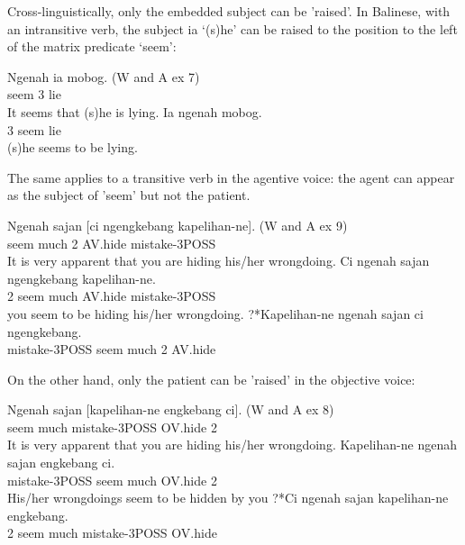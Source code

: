 \documentclass[output=paper]{langsci/langscibook}
\begin{document}
Cross-linguistically, only the embedded subject can be 'raised'. In Balinese, with an intransitive verb, the subject ia ‘(s)he’ can be raised to the position to the left of the matrix predicate  ‘seem’:

\begin{exe}
\ex \begin{xlist}
\ex \gll Ngenah ia mobog. (W and A ex 7)\\
seem 3 lie\\
\glt It seems that (s)he is lying.
\ex \gll  Ia ngenah mobog.\\
3 seem lie\\
\glt (s)he seems to be lying.
\end{xlist}
\end{exe}

The same applies to a transitive verb in the agentive voice: the agent can appear as the subject of 'seem' but not the patient.

\begin{exe}
\ex \begin{xlist}
\ex \gll Ngenah sajan [ci ngengkebang kapelihan-ne]. (W and A ex 9)\\
seem much 2 AV.hide mistake-3POSS\\
\glt It is very apparent that you are hiding his/her wrongdoing.
\ex \gll Ci ngenah sajan ngengkebang kapelihan-ne.\\
2 seem much AV.hide mistake-3POSS\\
\glt you seem to be hiding his/her wrongdoing.
\ex ?*Kapelihan-ne ngenah sajan ci ngengkebang.\\
mistake-3POSS seem much 2 AV.hide
\end{xlist}

\end{exe}

On the other hand, only the patient can be 'raised' in the objective voice:

\begin{exe}
\ex \begin{xlist}
\ex \gll Ngenah sajan [kapelihan-ne engkebang ci]. (W and A ex 8)\\
seem much mistake-3POSS OV.hide 2\\
\glt It is very apparent that you are hiding his/her wrongdoing.
\ex \gll Kapelihan-ne ngenah sajan engkebang ci.\\
mistake-3POSS seem much OV.hide 2 \\
\glt His/her wrongdoings seem to be hidden by you 
\ex \gll ?*Ci ngenah sajan kapelihan-ne engkebang.\\
2 seem much mistake-3POSS OV.hide \\
\end{xlist}

\end{exe}
\end{document}
